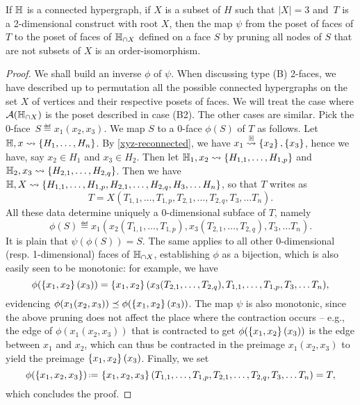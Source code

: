 \begin{lemma} 
  \label{instance-construct} 
  If ${\mathbb H}$ is a connected hypergraph, if $X$ is a subset of $H$ such that $|X|=3$ and~$T$ is a 2-dimensional construct with root $X$, then the map $\psi$ from the poset of  faces of $T$ to the poset of faces of 
${\mathbb H}_{\cap X}$ defined on a face $S$  by pruning all nodes of $S$ that are not subsets of $X$ is an order-isomorphism.
\end{lemma}

\begin{proof}
We shall build an inverse $\phi$ of $\psi$.
When discussing type (B) 2-faces, we have described up to permutation all the possible connected hypergraphs on the set $X$ of vertices and their respective posets of faces. 
We will treat the case where ${\cal A}({\mathbb H}_{\cap X})$ is the poset described in case (B2). The other cases are similar.
Pick the 0-face~$S\eqdef  x_1(x_2,x_3)$. 
We map $S$ to a $0$-face $\phi(S)$ of $T$ as follows. 
Let ${\mathbb H},x\leadsto \{H_1,\ldots,H_n\}$. 
By \cref{xyz-reconnected}, we have $x_1\stackrel{{\mathbb H}}{\rightsquigarrow}\left\{x_2\right\},\left\{x_3\right\}$, hence we have, say $x_2\in H_1$ and $x_3\in H_2$. Then let
  ${\mathbb H_1},x_2\leadsto \{H_{1,1},\ldots,H_{1,p}\}$ and ${\mathbb H_2},x_3\leadsto \{H_{2,1},\ldots,H_{2,q}\}$.
  Then we have ${\mathbb H},X\leadsto \{H_{1,1},\ldots,H_{1,p},H_{2,1},\ldots,H_{2,q},H_3,\ldots H_n\}$, so that $T$ writes as
  $$T= X(T_{1,1},\ldots,T_{1,p},T_{2,1},\ldots,T_{2,q},T_3,\ldots T_n).$$ 
All these data determine uniquely a 0-dimensional subface of $T$, namely
  $$\phi(S)\eqdef x_1(x_2(T_{1,1},\ldots,T_{1,p}),x_3(T_{2,1},\ldots,T_{2,q}),T_3,\ldots T_n).$$
It is plain that $\psi(\phi(S))=S$.
  The same applies to all other 0-dimensional (resp. 1-dimensional) faces of ${\mathbb H}_{\cap X}$, establishing $\phi$ as a bijection, which is also easily seen to be monotonic: for example, we have
 $$\phi(\left\{x_1,x_2\right\}(x_3))= \left\{x_1,x_2\right\}(x_3(T_{2,1},\ldots,T_{2,q}),T_{1,1},\ldots,T_{1,p},T_3,\ldots T_n),$$
 evidencing $\phi(x_1(x_2,x_3))\preceq \phi(\left\{x_1,x_2\right\}(x_3))$. 
 The map $\psi$ is also monotonic, since the above pruning does not affect the place where the contraction occurs -- e.g., the edge of $\phi(x_1(x_2,x_3))$ that is contracted to get $\phi(\left\{x_1,x_2\right\}(x_3))$ is the edge between $x_1$ and $x_2$, which can thus be contracted in the preimage $x_1(x_2,x_3)$ to yield the preimage $\left\{x_1,x_2\right\}(x_3)$.
 Finally, we set
 $$\phi(\set{x_1,x_2,x_3})\eqdef \set{x_1,x_2,x_3}(T_{1,1},\ldots,T_{1,p},T_{2,1},\ldots,T_{2,q},T_3,\ldots T_n)=T,$$
 which concludes the proof.
 \end{proof}

